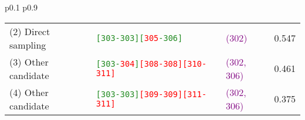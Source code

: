 \begin{table*}[t!]
{\begin{tabular}{p{0.1\linewidth} p{0.9\linewidth}}
{\begin{tabular*}{\textwidth}{@{\extracolsep{\fill}}llll}
(2) Direct sampling & 
\texttt{\textcolor{ForestGreen}{[303}\textcolor{ForestGreen}{-303]}\textcolor{ForestGreen}{[}\textcolor{red}{305}\textcolor{ForestGreen}{-306]}} & 
\textcolor{purple}{(302)} & 
0.547 \\

(3) Other candidate & 
\texttt{\textcolor{ForestGreen}{[303-}\textcolor{red}{304}\textcolor{ForestGreen}{]}\textcolor{red}{[308-308][310-311]}} & 
\textcolor{purple}{(302, 306)} & 
0.461 \\

(4) Other candidate & 
\texttt{\textcolor{ForestGreen}{[303-303]}\textcolor{red}{[309-309][311-311]}} & 
\textcolor{purple}{(302, 306)} & 
0.375 \\
\end{tabular*}
}
\\

\bottomrule
\end{tabular}
}
\end{table*}

